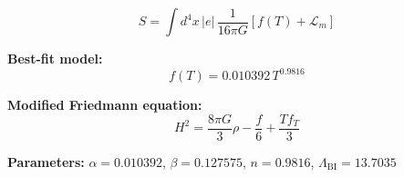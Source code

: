 
\begin{equation}
  S = \int d^4x \, |e| \, \frac{1}{16\pi G} \left[ f(T) + \mathcal{L}_m \right]
\end{equation}

\textbf{Best-fit model:}
\begin{equation}
  f(T) = 0.010392 \, T^{0.9816}
\end{equation}

\textbf{Modified Friedmann equation:}
\begin{equation}
  H^2 = \frac{8\pi G}{3} \rho - \frac{f}{6} + \frac{T f_T}{3}
\end{equation}

\textbf{Parameters:}
$\alpha = 0.010392$, \quad
$\beta = 0.127575$, \quad
$n = 0.9816$, \quad
$\Lambda_{\text{BI}} = 13.7035$